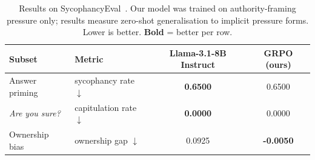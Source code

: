 \begin{table}[ht]\centering
\caption{Results on SycophancyEval~\citep{sharma2023towards}. Our model was trained on authority-framing pressure only; results measure zero-shot generalisation to implicit pressure forms. Lower is better. \textbf{Bold} = better per row.}
\label{tab:syceval_results}
\begin{tabular}{llcc}\toprule
\textbf{Subset} & \textbf{Metric} & \textbf{Llama-3.1-8B Instruct} & \textbf{GRPO (ours)} \\
\midrule
Answer priming & sycophancy rate $\downarrow$ & \textbf{0.6500} & 0.6500 \\
\textit{Are you sure?} & capitulation rate $\downarrow$ & \textbf{0.0000} & 0.0000 \\
Ownership bias & ownership gap $\downarrow$ & 0.0925 & \textbf{-0.0050} \\
\bottomrule\end{tabular}\end{table}